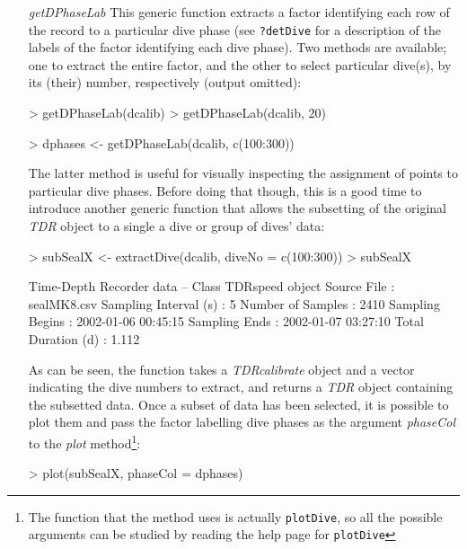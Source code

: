 \documentclass[12pt, letterpaper]{scrartcl}
\newcommand{\Rfunction}[1]{{\texttt{#1}}}
\newcommand{\Rclass}[1]{{\textit{#1}}}
\newcommand{\Rmethod}[1]{{\textit{#1}}}
\newcommand{\Rfunarg}[1]{{\textit{#1}}}
\begin{document}
\begin{itemize}
\item [\Rmethod{getDPhaseLab}] This generic function extracts a factor
  identifying each row of the record to a particular dive phase (see
  \verb|?detDive| for a description of the labels of the factor
  identifying each dive phase).  Two methods are available; one to extract
  the entire factor, and the other to select particular dive(s), by its
  (their) number, respectively (output omitted):
\begin{Schunk}
\begin{Sinput}
> getDPhaseLab(dcalib)
> getDPhaseLab(dcalib, 20)
\end{Sinput}
\end{Schunk}
\begin{Schunk}
\begin{Sinput}
> dphases <- getDPhaseLab(dcalib, c(100:300))
\end{Sinput}
\end{Schunk}
The latter method is useful for visually inspecting the assignment of
points to particular dive phases.  Before doing that though, this is a
good time to introduce another generic function that allows the subsetting
of the original \Rclass{TDR} object to a single a dive or group of dives'
data:
\begin{Schunk}
\begin{Sinput}
> subSealX <- extractDive(dcalib, diveNo = c(100:300))
> subSealX
\end{Sinput}
\begin{Soutput}
Time-Depth Recorder data -- Class TDRspeed object
  Source File             : sealMK8.csv 
  Sampling Interval (s)   : 5 
  Number of Samples       : 2410 
  Sampling Begins         : 2002-01-06 00:45:15 
  Sampling Ends           : 2002-01-07 03:27:10 
  Total Duration (d)      : 1.112 
\end{Soutput}
\end{Schunk}

As can be seen, the function takes a \Rclass{TDRcalibrate} object and a
vector indicating the dive numbers to extract, and returns a \Rclass{TDR}
object containing the subsetted data.  Once a subset of data has been
selected, it is possible to plot them and pass the factor labelling dive
phases as the argument \Rfunarg{phaseCol} to the \Rmethod{plot}
method\footnote{The function that the method uses is actually
  \Rfunction{plotDive}, so all the possible arguments can be studied by
  reading the help page for \Rfunction{plotDive}}:

\begin{Schunk}
\begin{Sinput}
> plot(subSealX, phaseCol = dphases)
\end{Sinput}
\end{Schunk}

\end{itemize}
\end{document}
